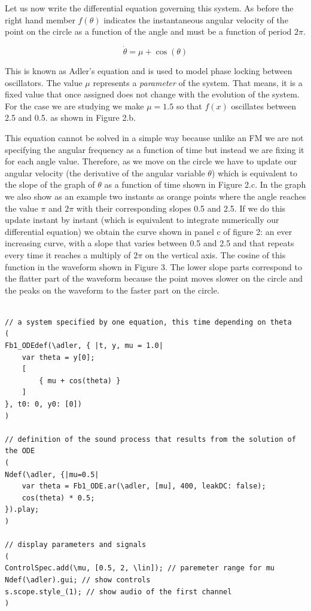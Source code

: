 \documentclass{article}
\begin{document}
Let us now write the differential equation governing this system. As before the right hand member $f(\theta)$ indicates the instantaneous angular velocity of the point on the circle as a function of the angle and must be a function of period $2\pi$. 

\begin{equation} \label{eq_adler}
\dot\theta = \mu + \cos(\theta)
\end{equation}

This is known as Adler's equation and is used to model phase locking between oscillators. 
The value $\mu$ represents a {\em parameter} of the system. 
That means, it is a fixed value that once assigned does not change with the evolution of the system. 
For the case we are studying we make $\mu=1.5$ so that $f(x)$ oscillates between 2.5 and 0.5. as shown in Figure 2.b.

This equation cannot be solved in a simple way because unlike an FM we are not specifying the angular frequency as a function of time but instead we are fixing it for each angle value. 
Therefore, as we move on the circle we have to update our angular velocity (the derivative of the angular variable $\theta$) which is equivalent to the slope of the graph of $\theta$ as a function of time shown in Figure 2.c. 
In the graph we also show as an example two instants as orange points where the angle reaches the value $\pi$ and $2\pi$ with their corresponding slopes 0.5 and 2.5. 
If we do this update instant by instant (which is equivalent to integrate numerically our differential equation) we obtain the curve shown in panel c of figure 2: an ever increasing curve, with a slope that varies between 0.5 and 2.5 and that repeats every time it reaches a multiply of $2\pi$ on the vertical axis. 
The cosine of this function in the waveform shown in Figure 3. 
The lower slope parts correspond to the flatter part of the waveform because the point moves slower on the circle and the peaks on the waveform to the faster part on the circle.

\begin{lstlisting}[frame=single,caption=Sound from the Adler equation.]

// a system specified by one equation, this time depending on theta
(
Fb1_ODEdef(\adler, { |t, y, mu = 1.0|
	var theta = y[0];
	[
		{ mu + cos(theta) }
	]
}, t0: 0, y0: [0])
)

// definition of the sound process that results from the solution of the ODE
(
Ndef(\adler, {|mu=0.5|
	var theta = Fb1_ODE.ar(\adler, [mu], 400, leakDC: false);
	cos(theta) * 0.5;
}).play;
)

// display parameters and signals
(
ControlSpec.add(\mu, [0.5, 2, \lin]); // paremeter range for mu
Ndef(\adler).gui; // show controls
s.scope.style_(1); // show audio of the first channel
)
\end{lstlisting}
\end{document}
